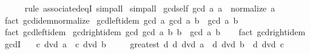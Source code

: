 \begin{isabellebody}
\ \ \ \ \isamarkupfalse%
\ {\isacharparenleft}{\kern0pt}rule\ associated{\isacharunderscore}{\kern0pt}eqI{\isacharparenright}{\kern0pt}\ simp{\isacharunderscore}{\kern0pt}all\isanewline
{}\isamarkupfalse%
\ simp{\isacharunderscore}{\kern0pt}all%
\endisatagproof
{\isafoldproof}%
%
\isadelimproof
\isanewline
%
\endisadelimproof
\isanewline
{}\isamarkupfalse%
\ gcd{\isacharunderscore}{\kern0pt}self{\isacharcolon}{\kern0pt}\ {\isachardoublequoteopen}gcd\ a\ a\ {\isacharequal}{\kern0pt}\ normalize\ a{\isachardoublequoteclose}\isanewline
%
\isadelimproof
\ \ %
\endisadelimproof
%
\isatagproof
{}\isamarkupfalse%
\ {\isacharparenleft}{\kern0pt}fact\ gcd{\isachardot}{\kern0pt}idem{\isacharunderscore}{\kern0pt}normalize{\isacharparenright}{\kern0pt}%
\endisatagproof
{\isafoldproof}%
%
\isadelimproof
\isanewline
%
\endisadelimproof
\isanewline
{}\isamarkupfalse%
\ gcd{\isacharunderscore}{\kern0pt}left{\isacharunderscore}{\kern0pt}idem{\isacharcolon}{\kern0pt}\ {\isachardoublequoteopen}gcd\ a\ {\isacharparenleft}{\kern0pt}gcd\ a\ b{\isacharparenright}{\kern0pt}\ {\isacharequal}{\kern0pt}\ gcd\ a\ b{\isachardoublequoteclose}\isanewline
%
\isadelimproof
\ \ %
\endisadelimproof
%
\isatagproof
{}\isamarkupfalse%
\ {\isacharparenleft}{\kern0pt}fact\ gcd{\isachardot}{\kern0pt}left{\isacharunderscore}{\kern0pt}idem{\isacharparenright}{\kern0pt}%
\endisatagproof
{\isafoldproof}%
%
\isadelimproof
\isanewline
%
\endisadelimproof
\isanewline
{}\isamarkupfalse%
\ gcd{\isacharunderscore}{\kern0pt}right{\isacharunderscore}{\kern0pt}idem{\isacharcolon}{\kern0pt}\ {\isachardoublequoteopen}gcd\ {\isacharparenleft}{\kern0pt}gcd\ a\ b{\isacharparenright}{\kern0pt}\ b\ {\isacharequal}{\kern0pt}\ gcd\ a\ b{\isachardoublequoteclose}\isanewline
%
\isadelimproof
\ \ %
\endisadelimproof
%
\isatagproof
{}\isamarkupfalse%
\ {\isacharparenleft}{\kern0pt}fact\ gcd{\isachardot}{\kern0pt}right{\isacharunderscore}{\kern0pt}idem{\isacharparenright}{\kern0pt}%
\endisatagproof
{\isafoldproof}%
%
\isadelimproof
\isanewline
%
\endisadelimproof
\isanewline
{}\isamarkupfalse%
\ gcdI{\isacharcolon}{\kern0pt}\isanewline
\ \ \ {\isachardoublequoteopen}c\ dvd\ a{\isachardoublequoteclose}\ \ {\isachardoublequoteopen}c\ dvd\ b{\isachardoublequoteclose}\isanewline
\ \ \ \ \ greatest{\isacharcolon}{\kern0pt}\ {\isachardoublequoteopen}{\isasymAnd}d{\isachardot}{\kern0pt}\ d\ dvd\ a\ {\isasymLongrightarrow}\ d\ dvd\ b\ {\isasymLongrightarrow}\ d\ dvd\ c{\isachardoublequoteclose}\isanewline

\end{isabellebody}
